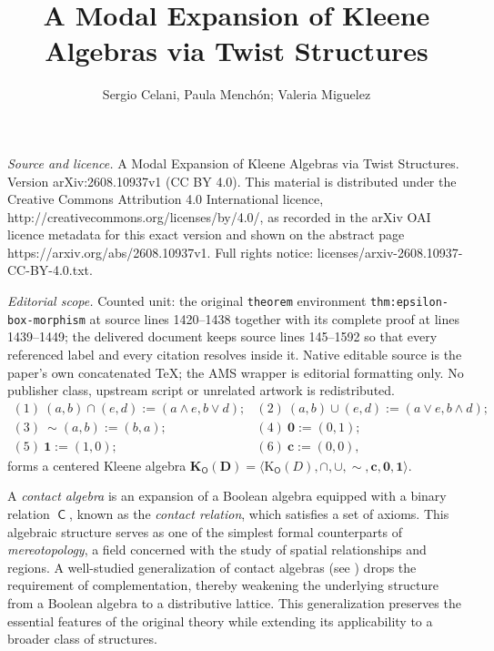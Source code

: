 \documentclass[10pt,a4paper]{amsart}
\DeclareMathOperator{\con}{\mathsf{C}}
\DeclareMathOperator{\Overl}{\mathsf{O}}
\newcommand{\KO}[1]{\mathrm{K}_{\Overl}(#1)}
\newcommand{\cbf}{\mathbf{c}}
\newcommand{\one}{\mathbf{1}}
\newcommand{\zero}{\mathbf{0}}
\newcommand{\D}{\mathbf{D}}
\begin{document}
\title[A Modal Expansion of Kleene Algebras via Twist Structures]{A Modal Expansion of Kleene Algebras via Twist Structures}
\author{Sergio Celani, Paula Menchón; Valeria Miguelez}
\date{}
\maketitle
\noindent\emph{Source and licence.} A Modal Expansion of Kleene Algebras via Twist Structures. Version arXiv:2608.10937v1 (CC BY 4.0). This material is distributed under the Creative Commons Attribution 4.0 International licence, http://creativecommons.org/licenses/by/4.0/, as recorded in the arXiv OAI licence metadata for this exact version and shown on the abstract page https://arxiv.org/abs/2608.10937v1. Full rights notice: licenses/arxiv-2608.10937-CC-BY-4.0.txt.\par\smallskip
\noindent\textit{Editorial scope.} Counted unit: the original \texttt{theorem} environment \texttt{thm:epsilon-box-morphism} at source lines 1420--1438 together with its complete proof at lines 1439--1449; the delivered document keeps source lines 145--1592 so that every referenced label and every citation resolves inside it. Native editable source is the paper's own concatenated TeX; the AMS wrapper is editorial formatting only. No publisher class, upstream script or unrelated artwork is redistributed.
\begin{equation}
\label{eq:twist-operations}
\begin{array}{ll}
(1) \ (a,b) \cap (e,d) := (a \wedge e, b \vee d); & (2) \ (a,b) \cup (e,d) := (a \vee e, b \wedge d); \\
(3) \ \sim(a,b) := (b,a); & (4) \ \zero := (0,1); \\
(5) \ \one := (1,0); & (6) \ \cbf := (0,0),
\end{array}
\end{equation}
forms a centered Kleene algebra $\mathbf{K}_{\Overl}(\D)=\langle \KO{D},\cap,\cup,\sim,\cbf,\zero,\one\rangle$. 

A \emph{contact algebra} is an expansion of a Boolean algebra equipped with a binary relation $\con$, known as the \emph{contact relation}, which satisfies a set of axioms. This algebraic structure serves as one of the simplest formal counterparts of \emph{mereotopology}, a field concerned with the study of spatial relationships and regions.
A well-studied generalization of contact algebras (see \cite{duntsch2006topological,duntsch2008distributive}) drops the requirement of complementation, thereby weakening the underlying structure from a Boolean algebra to a distributive lattice. This generalization preserves the essential features of the original theory while extending its applicability to a broader class of structures.
\end{document}
